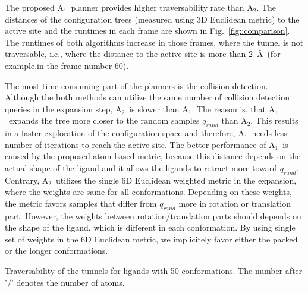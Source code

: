 \documentclass[usletter, 10pt, conference]{ieeeconf} %
\def\qrand{q_{rand}}
\def\RA{A$_{1}$}
\def\RB{A$_{2}$}
\begin{document}
The proposed \RA\ planner provides higher traversability rate than \RB.
The distances of the configuration trees (measured using 3D Euclidean metric) to the active site and the runtimes in each frame
are shown in Fig.~\ref{fig::comparison}.
The runtimes of both algorithms increase in those frames, where the tunnel is not traversable, i.e., where the distance
to the active site is more than 2~\AA\ (for example,in the frame number 60).



The most time consuming part of the planners is the collision detection. 
Although the both methods can utilize the same number of collision detection queries in the expansion step, \RB\ is slower than \RA.
The reason is, that \RA\ expands the tree more closer to the random samples $\qrand$ than \RB.
This results in a faster exploration of the configuration space and therefore, \RA\ needs less number of iterations to reach the active site.
The better performance of \RA\ is caused by the proposed atom-based metric, because this distance depends on the actual shape of the ligand and 
it allows the ligands to retract more toward $\qrand$.
Contrary, \RB\ utilizes the single 6D Euclidean weighted metric in the expansion, where the weights are same for all conformations.
Depending on these weights, the metric favors samples that differ from $\qrand$ more in rotation or translation part.
However, the weights between rotation/translation parts should depends on the shape of the ligand, which is different in each conformation.
By using single set of weights in the 6D Euclidean metric, we implicitely favor either the packed or the longer conformations.

\begin{table}
\centering
\caption{\label{tab::main}
    Traversability of the tunnels for ligands with 50 conformations. 
    The number after '$/$' denotes the number of atoms.
}
\small
\renewcommand{\tabcolsep}{4.3pt}
{\small

}
\end{table}
\end{document}
